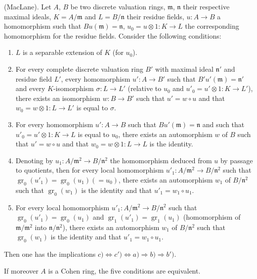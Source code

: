 \begin{proposition}[21.5.2]
\label{0.21.5.2}
\textnormal{(MacLane).}
Let $A$, $B$ be two discrete valuation rings, $\mathfrak{m}$, $\mathfrak{n}$ their respective maximal ideals, $K=A/\mathfrak{m}$ and $L=B/\mathfrak{n}$ their residue fields, $u:A\to B$ a homomorphism such that $Bu(\mathfrak{m})=\mathfrak{n}$, $u_0=u\otimes 1:K\to L$ the corresponding homomorphism for the residue fields.
Consider the following conditions:
\begin{enumerate}
  \item[\rm a)] $L$ is a separable extension of $K$ \textup{(}for $u_0$\textup{)}.
  \item[\rm b)] For every complete discrete valuation ring $B'$ with maximal ideal $\mathfrak{n}'$ and residue field $L'$,
    every homomorphism $u':A\to B'$ such that $B'u'(\mathfrak{m})=\mathfrak{n}'$ and every $K$-isomorphism $\sigma:L\to L'$ \textup{(}relative to $u_0$ and $u'_0=u'\otimes 1:K\to L'$\textup{)}, there exists an isomorphism $w:B\to B'$ such that $u'=w\circ u$ and that $w_0=w\otimes 1:L\to L'$ is equal to $\sigma$.
  \item[\rm b$'$)] For every homomorphism $u':A\to B$ such that $Bu'(\mathfrak{m})=\mathfrak{n}$ and such that $u'_0=u'\otimes 1:K\to L$ is equal to $u_0$, there exists an automorphism $w$ of $B$ such that $u'=w\circ u$ and that $w_0=w\otimes 1:L\to L$ is the identity.
  \item[\rm c)] Denoting by $u_1:A/\mathfrak{m}^2\to B/\mathfrak{n}^2$ the homomorphism deduced from $u$ by passage to quotients, then for every local homomorphism $u'_1:A/\mathfrak{m}^2\to B/\mathfrak{n}^2$ such that $\operatorname{gr}_0(u'_1)=\operatorname{gr}_0(u_1)(=u_0)$, there exists an automorphism $w_1$ of $B/\mathfrak{n}^2$ such that $\operatorname{gr}_0(w_1)$ is the identity and that $u'_1=w_1\circ u_1$.
  \item[\rm c$'$)] For every local homomorphism $u'_1:A/\mathfrak{m}^2\to B/\mathfrak{n}^2$ such that $\operatorname{gr}_0(u'_1)=\operatorname{gr}_0(u_1)$ and $\operatorname{gr}_1(u'_1)=\operatorname{gr}_1(u_1)$ \textup{(}homomorphism of $\mathfrak{m}/\mathfrak{m}^2$ into $\mathfrak{n}/\mathfrak{n}^2$\textup{)}, there exists an automorphism $w_1$ of $B/\mathfrak{n}^2$ such that $\operatorname{gr}_0(w_1)$ is the identity and that $u'_1=w_1\circ u_1$.
\end{enumerate}
Then one has the implications $c)\Leftrightarrow c')\Leftrightarrow a)\Rightarrow b)\Rightarrow b')$.

If moreover $A$ is a Cohen ring, the five conditions are equivalent.
\end{proposition}

